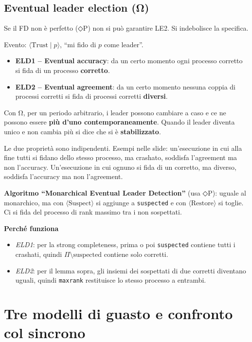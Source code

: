 \subsection{Eventual leader election (Ω)}

Se il FD non è perfetto (◇P) non si può garantire LE2. Si indebolisce la specifica.

Evento: \(\langle \text{Trust} \mid p \rangle\), ``mi fido di \(p\) come leader''.

\begin{itemize}
\tightlist
\item
  \textbf{ELD1 -- Eventual accuracy}: da un certo momento ogni processo corretto si fida di un processo \textbf{corretto}.
\item
  \textbf{ELD2 -- Eventual agreement}: da un certo momento nessuna coppia di processi corretti si fida di processi corretti \textbf{diversi}.
\end{itemize}

Con Ω, per un periodo arbitrario, i leader possono cambiare a caso e ce ne possono essere \textbf{più d'uno contemporaneamente}. Quando il leader diventa unico e non cambia più si dice che si è \textbf{stabilizzato}.

Le due proprietà sono indipendenti. Esempi nelle slide: un'esecuzione in cui alla fine tutti si fidano dello stesso processo, ma crashato, soddisfa l'agreement ma non l'accuracy. Un'esecuzione in cui ognuno si fida di un corretto, ma diverso, soddisfa l'accuracy ma non l'agreement.

\textbf{Algoritmo ``Monarchical Eventual Leader Detection''} (usa ◇P): uguale al monarchico, ma con \(\langle \text{Suspect} \rangle\) si aggiunge a \texttt{suspected} e con \(\langle \text{Restore} \rangle\) si toglie. Ci si fida del processo di rank massimo tra i non sospettati.

\textbf{Perché funziona}

\begin{itemize}
\tightlist
\item
  \emph{ELD1}: per la strong completeness, prima o poi \texttt{suspected} contiene tutti i crashati, quindi \(\Pi \setminus \text{suspected}\) contiene solo corretti.
\item
  \emph{ELD2}: per il lemma sopra, gli insiemi dei sospettati di due corretti diventano uguali, quindi \texttt{maxrank} restituisce lo stesso processo a entrambi.
\end{itemize}

\section{Tre modelli di guasto e confronto col sincrono}

